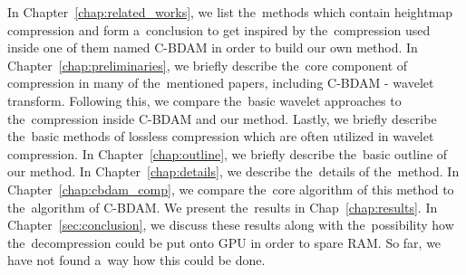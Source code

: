In Chapter~\ref{chap:related_works}, we list the~methods which contain heightmap compression and form a~conclusion to get inspired by the~compression used inside one of them named C-BDAM in order to build our own method. In Chapter~\ref{chap:preliminaries}, we briefly describe the~core component of compression in many of the~mentioned papers, including C-BDAM - wavelet transform. Following this, we compare the~basic wavelet approaches to the~compression inside C-BDAM and our method. Lastly, we briefly describe the~basic methods of lossless compression which are often utilized in wavelet compression. In Chapter~\ref{chap:outline}, we briefly describe the~basic outline of our method. In Chapter~\ref{chap:details}, we describe the~details of the~method. In Chapter~\ref{chap:cbdam_comp}, we compare the~core algorithm of this method to the~algorithm of C-BDAM. We present the~results in Chap~\ref{chap:results}. In Chapter~\ref{sec:conclusion}, we discuss these results along with the~possibility how the~decompression could be put onto GPU in order to spare RAM. So far, we have not found a~way how this could be done.